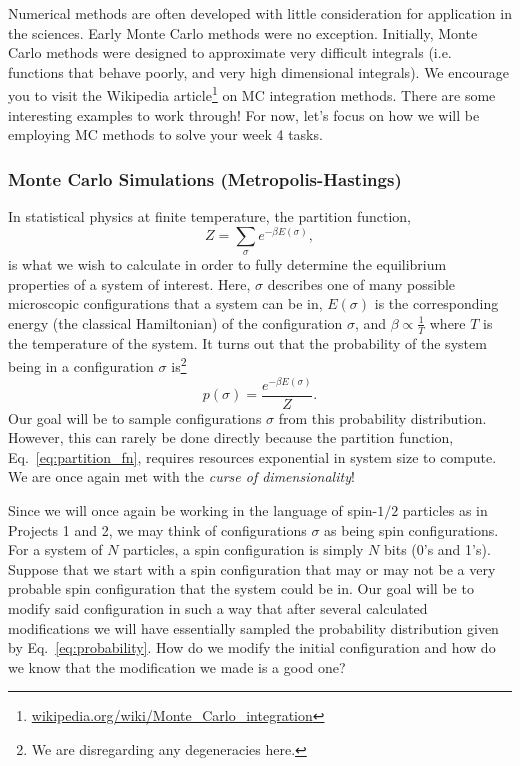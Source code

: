\documentclass[12pt]{article}
\begin{document}
Numerical methods are often developed with little consideration for application in the sciences. Early Monte Carlo methods were no exception. Initially, Monte Carlo methods were designed to approximate very difficult integrals (i.e. functions that behave poorly, and very high dimensional integrals). We encourage you to visit the Wikipedia article\footnote{\href{http://en.wikipedia.org/wiki/Monte\_Carlo\_integration}{wikipedia.org/wiki/Monte\_Carlo\_integration}} on MC integration methods. There are some interesting examples to work through! For now, let's focus on how we will be employing MC methods to solve your week 4 tasks.

\subsubsection{Monte Carlo Simulations (Metropolis-Hastings)}

In statistical physics at finite temperature, the partition function,
\begin{equation} \label{eq:partition_fn}
    Z = \sum_{\sigma} e^{-\beta E(\sigma)},
\end{equation}
is what we wish to calculate in order to fully determine the equilibrium properties of a system of interest. Here, $\sigma$ describes one of many possible microscopic configurations that a system can be in, $E(\sigma)$ is the corresponding energy (the classical Hamiltonian)
of the configuration $\sigma$, and $\beta \propto \frac{1}{T}$ where $T$ is the temperature of the system. It turns out that the probability of the system being in a configuration $\sigma$ is\footnote{We are disregarding any degeneracies here.}
\begin{equation} \label{eq:probability}
    p(\sigma) = \frac{e^{-\beta E(\sigma)}}{Z}.
\end{equation}
Our goal will be to sample configurations $\sigma$ from this probability distribution. However, this can rarely be done directly because the partition function, Eq.~\eqref{eq:partition_fn}, requires resources exponential in system size to compute. We are once again met with the {\it curse of dimensionality}!

Since we will once again be working in the language of spin-$1/2$ particles as in Projects 1 and 2, we may think of configurations $\sigma$ as being spin configurations. For a system of $N$ particles, a spin configuration is simply $N$ bits (0's and 1's). Suppose that we start with a spin configuration that may or may not be a very probable spin configuration that the system could be in. Our goal will be to modify said configuration in such a way that after several calculated modifications we will have essentially sampled the probability distribution given by Eq.~\eqref{eq:probability}. How do we modify the initial configuration and how do we know that the modification we made is a good one?
\end{document}
